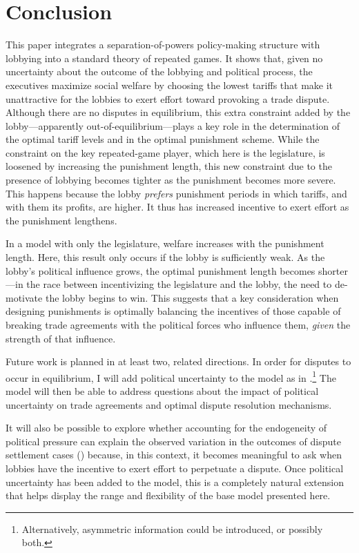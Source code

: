 \documentclass[authoryear, review]{elsarticle}
\begin{document}
\section{Conclusion}
\label{sec:concl3}
This paper integrates a separation-of-powers policy-making structure with lobbying into a standard theory of repeated games. It shows that, given no uncertainty about the outcome of the lobbying and political process, the executives maximize social welfare by choosing the lowest tariffs that make it unattractive for the lobbies to exert effort toward provoking a trade dispute. Although there are no disputes in equilibrium, this extra constraint added by the lobby---apparently out-of-equilibrium---plays a key role in the determination of the optimal tariff levels and in the optimal punishment scheme. While the constraint on the key repeated-game player, which here is the legislature, is loosened by increasing the punishment length, this new constraint due to the presence of lobbying becomes tighter as the punishment becomes more severe. This happens because the lobby \textit{prefers} punishment periods in which tariffs, and with them its profits, are higher. It thus has increased incentive to exert effort as the punishment lengthens.

In a model with only the legislature, welfare increases with the punishment length. Here, this result only occurs if the lobby is sufficiently weak. As the lobby's political influence grows, the optimal punishment length becomes shorter---in the race between incentivizing the legislature and the lobby, the need to de-motivate the lobby begins to win. This suggests that a key consideration when designing punishments is optimally balancing the incentives of those capable of breaking trade agreements with the political forces who influence them, \textit{given} the strength of that influence.

Future work is planned in at least two, related directions. In order for disputes to occur in equilibrium, I will add political uncertainty to the model as in \citet{buzard2013b}.\footnote{Alternatively, asymmetric information could be introduced, or possibly both.} The model will then be able to address questions about the impact of political uncertainty on trade agreements and optimal dispute resolution mechanisms.

It will also be possible to explore whether accounting for the endogeneity of political pressure can explain the observed variation in the outcomes of dispute settlement cases (\citet{buschrein}) because, in this context, it becomes meaningful to ask when lobbies have the incentive to exert effort to perpetuate a dispute. Once political uncertainty has been added to the model, this is a completely natural extension that helps display the range and flexibility of the base model presented here.
\end{document}
